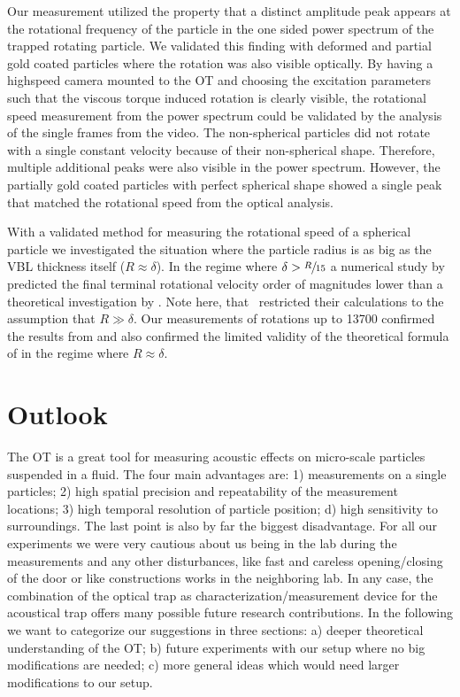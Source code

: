Our measurement utilized the property that a distinct amplitude peak appears at 
the rotational frequency of the particle in the one sided power spectrum of the 
trapped rotating particle. We validated this finding with deformed and partial 
gold coated particles where the rotation was also visible optically. By having 
a highspeed camera mounted to the OT and choosing the excitation parameters 
such that the viscous torque induced rotation is clearly visible, the 
rotational speed measurement from the power spectrum could be validated by the 
analysis of the single frames from the video. The non-spherical particles did 
not rotate with a single constant velocity because of their non-spherical 
shape.  Therefore, multiple additional peaks were also visible in the power 
spectrum.  However, the partially gold coated particles with perfect spherical 
shape showed a single peak that matched the rotational speed from the optical 
analysis.

With a validated method for measuring the rotational speed of a spherical 
particle we investigated the situation where the particle radius is as big as 
the VBL thickness itself ($R\approx\delta$). In the regime where $\delta > 
\sfrac{R}{15}$ a numerical study by  predicted the final 
terminal rotational velocity order of magnitudes lower than a theoretical 
investigation by . Note here, that~ 
restricted their calculations to the assumption that $R\gg\delta$. Our 
measurements of rotations up to \SI{13700}{\rpm} confirmed the results from 
 and also confirmed the limited validity of the theoretical 
formula of  in the regime where $R\approx\delta$.

\section{Outlook}

The OT is a great tool for measuring acoustic effects on micro-scale particles 
suspended in a fluid. The four main advantages are: 1) measurements on a single 
particles; 2) high spatial precision and repeatability of the measurement 
locations; 3) high temporal resolution of particle position; d) high 
sensitivity to surroundings. The last point is also by far the biggest 
disadvantage. For all our experiments we were very cautious about us being in 
the lab during the measurements and any other disturbances, like fast and 
careless opening/closing of the door or like constructions works in the 
neighboring lab. In any case, the combination of the optical trap as 
characterization/measurement device for the acoustical trap offers many 
possible future research contributions. In the following we want to categorize 
our suggestions in three sections: a) deeper theoretical understanding of the 
OT; b) future experiments with our setup where no big modifications are needed; 
c) more general ideas which would need larger modifications to our setup.

